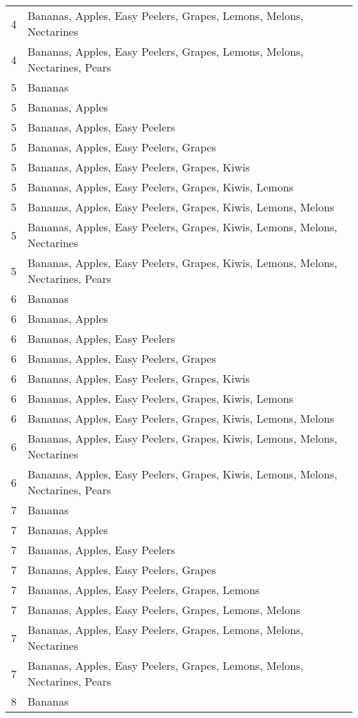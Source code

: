 \documentclass[11pt]{article}
\begin{document}
\begin{table}[h]
\begin{center}
\begin{tabular}{ll}
4 & Bananas, Apples, Easy Peelers, Grapes, Lemons, Melons, Nectarines \\
4 & Bananas, Apples, Easy Peelers, Grapes, Lemons, Melons, Nectarines, Pears \\
5 & Bananas \\
5 & Bananas, Apples \\
5 & Bananas, Apples, Easy Peelers \\
5 & Bananas, Apples, Easy Peelers, Grapes \\
5 & Bananas, Apples, Easy Peelers, Grapes, Kiwis \\
5 & Bananas, Apples, Easy Peelers, Grapes, Kiwis, Lemons \\
5 & Bananas, Apples, Easy Peelers, Grapes, Kiwis, Lemons, Melons \\
5 & Bananas, Apples, Easy Peelers, Grapes, Kiwis, Lemons, Melons, Nectarines \\
5 & Bananas, Apples, Easy Peelers, Grapes, Kiwis, Lemons, Melons, Nectarines, Pears \\
6 & Bananas \\
6 & Bananas, Apples \\
6 & Bananas, Apples, Easy Peelers \\
6 & Bananas, Apples, Easy Peelers, Grapes \\
6 & Bananas, Apples, Easy Peelers, Grapes, Kiwis \\
6 & Bananas, Apples, Easy Peelers, Grapes, Kiwis, Lemons \\
6 & Bananas, Apples, Easy Peelers, Grapes, Kiwis, Lemons, Melons \\
6 & Bananas, Apples, Easy Peelers, Grapes, Kiwis, Lemons, Melons, Nectarines \\
6 & Bananas, Apples, Easy Peelers, Grapes, Kiwis, Lemons, Melons, Nectarines, Pears \\
7 & Bananas \\
7 & Bananas, Apples \\
7 & Bananas, Apples, Easy Peelers \\
7 & Bananas, Apples, Easy Peelers, Grapes \\
7 & Bananas, Apples, Easy Peelers, Grapes, Lemons \\
7 & Bananas, Apples, Easy Peelers, Grapes, Lemons, Melons \\
7 & Bananas, Apples, Easy Peelers, Grapes, Lemons, Melons, Nectarines \\
7 & Bananas, Apples, Easy Peelers, Grapes, Lemons, Melons, Nectarines, Pears \\
8 & Bananas \\

\end{tabular}
\end{center}
\end{table}
\end{document}
